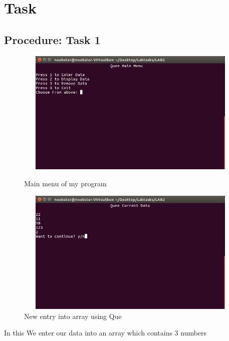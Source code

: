 \documentclass[11pt]{article}            %
\begin{document}
\section{Task}  
\subsection{Procedure: Task 1 }     

\begin{figure}
\centering
  \includegraphics[width=12cm,height=6cm,keepaspectratio]{1.png}
\caption{Main menu of my program}
\label{Figure:1}    
  \includegraphics[width=12cm,height=6cm,keepaspectratio]{2.png}
\caption{New entry into array using Que}
\label{Figure:2}   
\end{figure}
In this We enter our data into an  array  which contains  3 numbers
\end{document}
